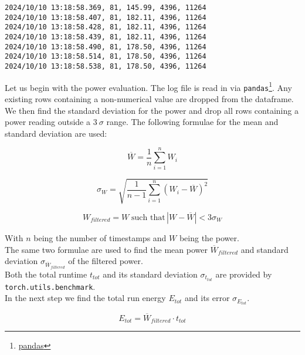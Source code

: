 \begin{verbatim}
2024/10/10 13:18:58.369, 81, 145.99, 4396, 11264
2024/10/10 13:18:58.407, 81, 182.11, 4396, 11264
2024/10/10 13:18:58.428, 81, 182.11, 4396, 11264
2024/10/10 13:18:58.439, 81, 182.11, 4396, 11264
2024/10/10 13:18:58.490, 81, 178.50, 4396, 11264
2024/10/10 13:18:58.514, 81, 178.50, 4396, 11264
2024/10/10 13:18:58.538, 81, 178.50, 4396, 11264
\end{verbatim}

Let us begin with the power evaluation. The log file is read in via \texttt{pandas}\footnote{\href{https://pandas.pydata.org/}{pandas}}. Any existing rows containing a non-numerical value are dropped from the dataframe. We then find the standard deviation for the power and drop all rows containing a power reading outside a $3 \: \sigma $ range. The following formulae for the mean and standard deviation are used:

\begin{equation}
\overline{W} = \frac{1}{n} \sum_{i=1}^{n} W_i
\end{equation}

\begin{equation}
\sigma_W = \sqrt{\frac{1}{n - 1} \sum_{i=1}^{n} (W_i - \overline{W})^2}
\end{equation}

\begin{equation}
W_{filtered} = W \; \text{such that} \, |W - \overline{W}| < 3 \sigma_W
\end{equation}
    
With \( n \) being the number of timestamps and \( W \) being the power. \\
The same two formulae are used to find the mean power \( \overline{W}_{filtered} \) and standard deviation \( \sigma_{\overline{W}_{filtered}} \) of the filtered power. \\
Both the total runtime \(t_{tot}\) and its standard deviation \(\sigma_{t_{tot}} \) are provided by \texttt{torch.utils.benchmark}.\\
In the next step we find the total run energy \( E_{tot} \) and its error \( \sigma_{E_{tot}} \).

\begin{equation}
E_{tot} = \overline{W}_{filtered} \cdot t_{tot}
\end{equation}


